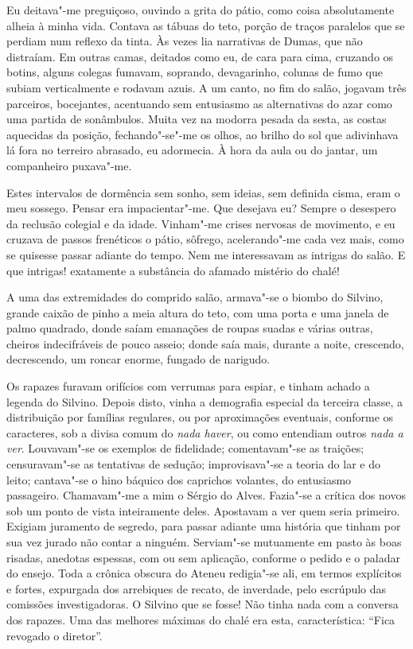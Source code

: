 Eu deitava"-me
preguiçoso, ouvindo a grita do pátio, como coisa absolutamente alheia à
minha vida. Contava as tábuas do teto, porção de traços paralelos que
se perdiam num reflexo da tinta. Às vezes lia narrativas de Dumas, que
não distraíam. Em outras camas, deitados como eu, de cara para cima,
cruzando os botins, alguns colegas fumavam, soprando, devagarinho,
colunas de fumo que subiam verticalmente e rodavam azuis. A um canto,
no fim do salão, jogavam três parceiros, bocejantes, acentuando sem
entusiasmo as alternativas do azar como uma partida de sonâmbulos.
Muita vez na modorra pesada da sesta, as costas aquecidas da posição,
fechando"-se"-me os olhos, ao brilho do sol que adivinhava lá fora no
terreiro abrasado, eu adormecia. À hora da aula ou do jantar, um
companheiro puxava"-me. 

Estes intervalos de dormência sem sonho, sem
ideias, sem definida cisma, eram o meu sossego. Pensar era
impacientar"-me. Que desejava eu? Sempre o desespero da reclusão
colegial e da idade. Vinham"-me crises nervosas de movimento, e eu
cruzava de passos frenéticos o pátio, sôfrego, acelerando"-me cada vez
mais, como se quisesse passar adiante do tempo. Nem me interessavam as
intrigas do salão. E que intrigas! exatamente a substância do afamado
mistério do chalé! 

A uma das extremidades do comprido salão,
armava"-se o biombo do Silvino, grande caixão de pinho a meia altura
do teto, com uma porta e uma janela de palmo quadrado, donde saíam
emanações de roupas suadas e várias outras, cheiros indecifráveis de
pouco asseio; donde saía mais, durante a noite, crescendo, decrescendo,
um roncar enorme, fungado de narigudo. 

Os rapazes furavam orifícios com
verrumas para espiar, e tinham achado a legenda do Silvino. Depois
disto, vinha a demografia especial da terceira classe, a distribuição
por famílias regulares, ou por aproximações eventuais, conforme os
caracteres, sob a divisa comum do \textit{nada haver}, ou como entendiam outros
\textit{nada a ver}. Louvavam"-se os exemplos de fidelidade; comentavam"-se as
traições; censuravam"-se as tentativas de sedução; improvisava"-se a
teoria do lar e do leito; cantava"-se o hino báquico dos caprichos
volantes, do entusiasmo passageiro. Chamavam"-me a mim o Sérgio do
Alves. Fazia"-se a crítica dos novos sob um ponto de vista
inteiramente deles. Apostavam a ver quem seria primeiro. Exigiam
juramento de segredo, para passar adiante uma história que tinham por
sua vez jurado não contar a ninguém. Serviam"-se mutuamente em pasto
às boas risadas, anedotas espessas, com ou sem aplicação, conforme o
pedido e o paladar do ensejo. Toda a crônica obscura do Ateneu
redigia"-se ali, em termos explícitos e fortes, expurgada dos
arrebiques de recato, de inverdade, pelo escrúpulo das comissões
investigadoras. O Silvino que se fosse! Não tinha nada com a conversa
dos rapazes. Uma das melhores máximas do chalé era esta, característica: 
``Fica revogado o diretor''. 

